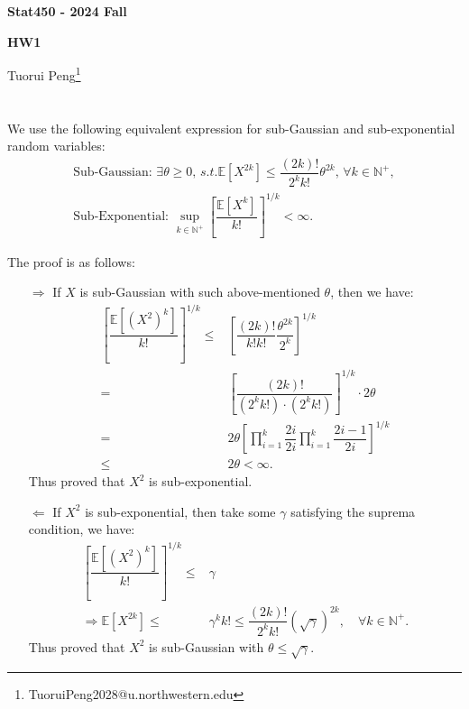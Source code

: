 \documentclass[11pt,a4paper]{ctexart}
\numberwithin{equation}{section}%
\begin{document}
\begin{center}\thispagestyle{plain}

{\LARGE\textbf{Stat450 - 2024 Fall}}

{\Large\textbf{HW1}}

Tuorui Peng\footnote{TuoruiPeng2028@u.northwestern.edu}
\end{center}

\thispagestyle{myheadings}
\pagestyle{myheadings}





  


\section{}
\subsection{}
We use the following equivalent expression for sub-Gaussian and sub-exponential random variables:
\begin{align*}
    \text{Sub-Gaussian: }\exists \theta \geq 0,\,s.t. \mathbb{E}\left[ X^{2k} \right] \leq \dfrac{ (2k)! }{ 2^kk! } \theta^{2k},\, \forall k \in \mathbb{N}^+,\\
    \text{Sub-Exponential: }\mathop{ \sup }\limits_{k\in\mathbb{N}^+} \left[\dfrac{ \mathbb{E}\left[ X^k  \right]  }{ k! } \right]^{1/k} < \infty .
\end{align*}

The proof is as follows:
\begin{itemize}[topsep=2pt,itemsep=0pt]
    \item[$ \Rightarrow $] If $ X $ is sub-Gaussian with such above-mentioned $ \theta $, then we have:
    \begin{align*}
        \left[\dfrac{ \mathbb{E}\left[ (X^2)^k  \right]  }{ k! } \right]^{1/k} \leq & \left[ \dfrac{ (2k)! }{  k!k! } \dfrac{ \theta ^{2k} }{ 2^k }   \right]^{1/k}\\
        =& \left[ \dfrac{ (2k)! }{ (2^kk!)\cdot (2^k k!) }  \right]^{1/k} \cdot 2\theta \\
        =& 2\theta \left[ \prod_{i=1}^k \dfrac{ 2i }{ 2i } \prod_{i=1}^k \dfrac{ 2i-1 }{ 2i }    \right]^{1/k}\\
        \leq & 2\theta  < \infty.
    \end{align*}
    Thus proved that $ X^2 $ is sub-exponential.
    \item[$ \Leftarrow $] If $ X^2 $ is sub-exponential, then take some $ \gamma  $ satisfying the suprema condition, we have:
    \begin{align*}
        \left[\dfrac{ \mathbb{E}\left[ (X^2)^k  \right]  }{ k! } \right]^{1/k} \leq& \gamma \\
         \Rightarrow  \mathbb{E}\left[ X^{2k} \right] \leq & \gamma ^k k! \leq \dfrac{ (2k)! }{ 2^kk! }(\sqrt{\gamma })^{2k},\quad \forall k \in \mathbb{N}^+.
    \end{align*}
    Thus proved that $ X^2 $ is sub-Gaussian with $ \theta \leq  \sqrt{\gamma } $.
\end{itemize}
\end{document}
